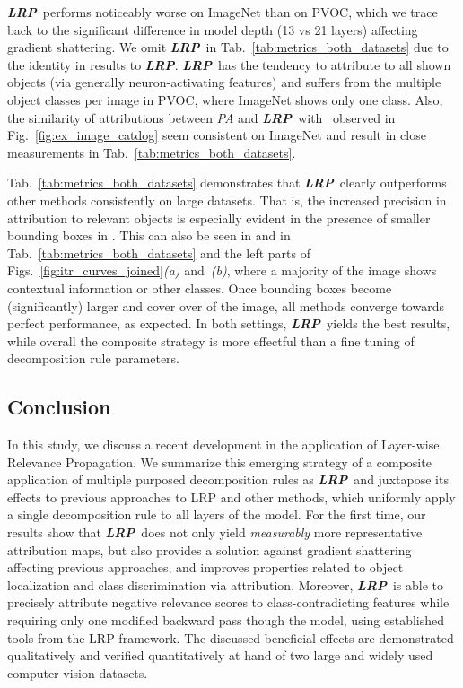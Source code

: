 \documentclass[conference]{IEEEtran}
\newcommand{\lrpz}[0]{\emph{LRP}}
\newcommand{\LRPZ}[0]{\textbf{\lrpz}}
\newcommand{\lrpeps}[0]{\emph{LRP}}
\newcommand{\LRPEPS}[0]{\textbf{\lrpeps}}
\newcommand{\lrpalphabeta}[0]{\emph{LRP}}
\newcommand{\LRPALPHABETA}[0]{\textbf{\lrpalphabeta}}
\newcommand{\lrpcnn}[0]{\emph{LRP}}
\newcommand{\LRPCMP}[0]{\textbf{\lrpcnn}}
\newcommand{\lrpcnnalphatwobetaoneflat}[0]{\emph{LRP}}
\newcommand{\LRPCNNALPHATWOBETAONEFLAT}[0]{\textbf{\lrpcnnalphatwobetaoneflat}}
\begin{document}
\LRPZ~performs noticeably worse on ImageNet than on PVOC,
which we trace back to the significant difference in model
depth (13 vs 21 layers)
affecting gradient shattering.
We omit \LRPEPS~in Tab.~\ref{tab:metrics_both_datasets} due to the identity in results to \LRPZ.
\LRPALPHABETA~has the tendency to attribute to all shown objects (via generally neuron-activating features) and suffers from the multiple object classes per image in PVOC,
where ImageNet shows only one class.
Also, the similarity of attributions between \emph{PA} and \LRPALPHABETA~with ~observed in Fig.~\ref{fig:ex_image_catdog} seem consistent on ImageNet and result in close measurements in Tab.~\ref{tab:metrics_both_datasets}.

Tab.~\ref{tab:metrics_both_datasets} demonstrates that \LRPCMP~clearly outperforms
other methods consistently on large datasets.
That is, the increased precision in attribution to relevant objects is especially evident in the presence of smaller bounding boxes in .
This can also be seen in  and  in Tab.~\ref{tab:metrics_both_datasets} and the left parts of Figs.~\ref{fig:itr_curves_joined}\emph{(a)} and~\emph{(b)}, where a majority of the image shows contextual information or other classes.
Once bounding boxes become (significantly) larger and cover over  of the image, all methods converge towards perfect performance, as expected.
In both settings, \LRPCNNALPHATWOBETAONEFLAT~yields the best results,
while overall the composite strategy is more effectful than a fine tuning of decomposition rule parameters.



\subsection{Conclusion}
In this study, we discuss a recent development in the application of Layer-wise Relevance Propagation.
We summarize this emerging strategy of a composite application of multiple purposed decomposition rules as \LRPCMP~and
juxtapose its effects to previous approaches to LRP and other methods, which uniformly apply a single decomposition rule to all layers of the model.
For the first time, our results show that \LRPCMP~does not only yield \emph{measurably} more representative attribution maps,
but also provides a solution against gradient shattering affecting previous approaches,
and improves properties related to object localization and class discrimination via attribution.
Moreover, \LRPCMP~is
able to precisely attribute negative relevance scores to class-contradicting features while requiring only one modified backward pass though the model, using established tools from the LRP framework.
The discussed beneficial effects are demonstrated qualitatively and verified quantitatively at hand of two large and widely used computer vision datasets.
\end{document}
